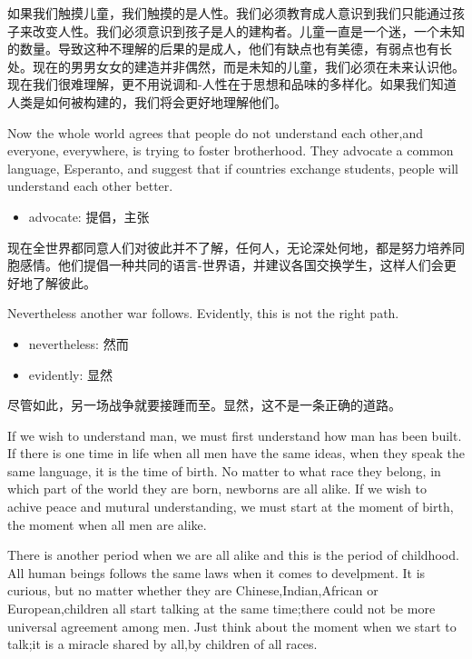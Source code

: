 \documentclass[lang=cn,10pt]{elegantbook}
\begin{document}
如果我们触摸儿童，我们触摸的是人性。我们必须教育成人意识到我们只能通过孩子来改变人性。我们必须意识到孩子是人的建构者。儿童一直是一个迷，一个未知的数量。导致这种不理解的后果的是成人，他们有缺点也有美德，有弱点也有长处。现在的男男女女的建造并非偶然，而是未知的儿童，我们必须在未来认识他。现在我们很难理解，更不用说调和-人性在于思想和品味的多样化。如果我们知道人类是如何被构建的，我们将会更好地理解他们。

Now the whole world agrees that people do not understand each other,and everyone, everywhere, is trying to foster brotherhood. They advocate a common language, Esperanto, and suggest that if countries exchange students, people will understand each other better.

\begin{tcolorbox}
    \begin{itemize}
        \item advocate: 提倡，主张
    \end{itemize}
\end{tcolorbox}

现在全世界都同意人们对彼此并不了解，任何人，无论深处何地，都是努力培养同胞感情。他们提倡一种共同的语言-世界语，并建议各国交换学生，这样人们会更好地了解彼此。

Nevertheless another war follows. Evidently, this is not the right path.

\begin{tcolorbox}
    \begin{itemize}
        \item nevertheless: 然而
        \item evidently: 显然
    \end{itemize}
\end{tcolorbox}

尽管如此，另一场战争就要接踵而至。显然，这不是一条正确的道路。

If we wish to understand man, we must first understand how man has been built. If there is one time in life when all men have the same ideas, when they speak the same language, it is the time of birth. No matter to what race they belong, in which part of the world they are born, newborns are all alike. If we wish to achive peace and mutural understanding, we must start at the moment of birth, the moment when all men are alike.



There is another period when we are all alike and this is the period of childhood. All human beings follows the same laws when it comes to develpment. It is curious, but no matter whether they are Chinese,Indian,African or European,children all start talking at the same time;there could not be more universal agreement among men. Just think about the moment when we start to talk;it is a miracle shared by all,by children of all races.
\end{document}
